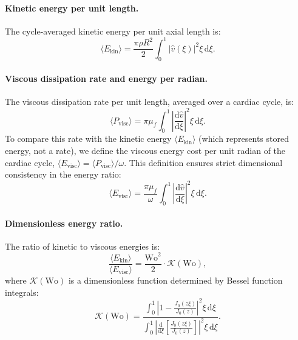 \documentclass[11pt,a4paper]{article}
\theoremstyle{remark}
\begin{document}
\paragraph{Kinetic energy per unit length.}
The cycle-averaged kinetic energy per unit axial length is:
\begin{equation}
    \langle E_{\mathrm{kin}} \rangle
    = \frac{\pi\rho R^2}{2} \int_0^1 |\hat{v}(\xi)|^2 \xi \, \mathrm{d}\xi.
\end{equation}

\paragraph{Viscous dissipation rate and energy per radian.}
The viscous dissipation rate per unit length, averaged over a cardiac cycle, is:
\begin{equation}
    \langle P_{\mathrm{visc}} \rangle
    = \pi\mu_f \int_0^1 \left|\frac{\mathrm{d}\hat{v}}{\mathrm{d}\xi}\right|^2 \xi \, \mathrm{d}\xi.
\end{equation}
To compare this rate with the kinetic energy $\langle E_{\mathrm{kin}} \rangle$
(which represents stored energy, not a rate), we define the viscous energy cost
per unit radian of the cardiac cycle, $\langle E_{\mathrm{visc}} \rangle =
\langle P_{\mathrm{visc}} \rangle / \omega$. This definition ensures strict
dimensional consistency in the energy ratio:
\begin{equation}
    \langle E_{\mathrm{visc}} \rangle
    = \frac{\pi\mu_f}{\omega} \int_0^1 \left|\frac{\mathrm{d}\hat{v}}{\mathrm{d}\xi}\right|^2 \xi \, \mathrm{d}\xi.
\end{equation}

\paragraph{Dimensionless energy ratio.}
The ratio of kinetic to viscous energies is:
\begin{equation}
    \frac{\langle E_{\mathrm{kin}} \rangle}{\langle E_{\mathrm{visc}} \rangle}
    = \frac{\mathrm{Wo}^2}{2} \cdot \mathcal{K}(\mathrm{Wo}),
\end{equation}
where $\mathcal{K}(\mathrm{Wo})$ is a dimensionless function determined by
Bessel function integrals:
\begin{equation}
    \mathcal{K}(\mathrm{Wo}) = \frac{\int_0^1 \left|1 - \frac{J_0(z\xi)}{J_0(z)}\right|^2 \xi \, \mathrm{d}\xi}
    {\int_0^1 \left|\frac{\mathrm{d}}{\mathrm{d}\xi}\left[\frac{J_0(z\xi)}{J_0(z)}\right]\right|^2 \xi \, \mathrm{d}\xi}.
\end{equation}
\end{document}
